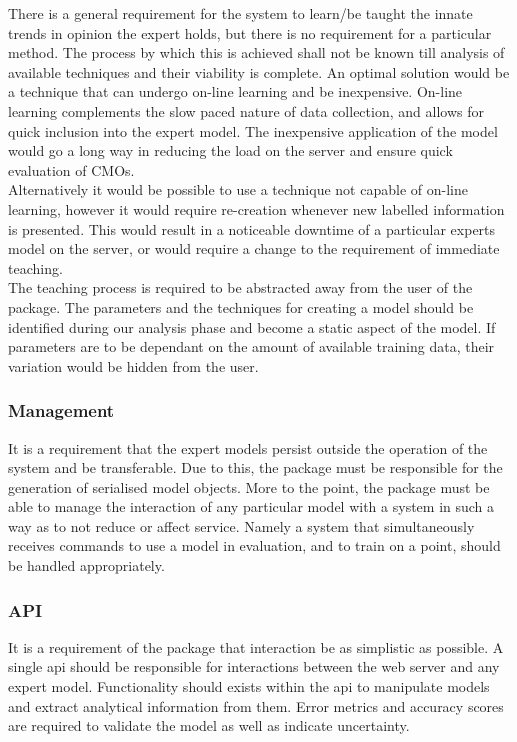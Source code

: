 \documentclass{ecmm427_assignment}
\begin{document}
There is a general requirement for the system to learn/be taught the innate trends in opinion the expert holds, but there is no requirement for a particular method. The process by which this is achieved shall not be known till analysis of available techniques and their viability is complete. An optimal solution would be a technique that can undergo on-line learning and be inexpensive. On-line learning complements the slow paced nature of data collection, and allows for quick inclusion into the expert model. The inexpensive application of the model would go a long way in reducing the load on the server and ensure quick evaluation of CMOs.\\

\noindent Alternatively it would be possible to use a technique not capable of on-line learning, however it would require re-creation whenever new labelled information is presented. This would result in a noticeable downtime of a particular experts model on the server, or would require a change to the requirement of immediate teaching.\\

\noindent The teaching process is required to be abstracted away from the user of the package. The parameters and the techniques for creating a model should be identified during our analysis phase and become a static aspect of the model. If parameters are to be dependant on the amount of available training data, their variation would be hidden from the user.

\subsubsection{Management}

It is a requirement that the expert models persist outside the operation of the system and be transferable. Due to this, the package must be responsible for the generation of serialised model objects. More to the point, the package must be able to manage the interaction of any particular model with a system in such a way as to not reduce or affect service. Namely a system that simultaneously receives commands to use a model in evaluation, and to train on a point, should be handled appropriately.

\subsubsection{API}

It is a requirement of the package that interaction be as simplistic as possible. A single api should be responsible for interactions between the web server and any expert model. Functionality should exists within the api to manipulate models and extract analytical information from them. Error metrics and accuracy scores are required to validate the model as well as indicate uncertainty.
\end{document}
